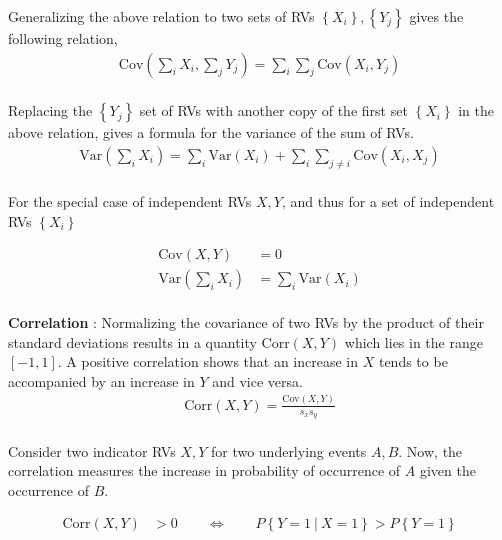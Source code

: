 Generalizing the above relation to two sets of RVs $ \left\{X_i\right\}, \left\{Y_j\right\} $ gives the following relation, 
\begin{align}
	\mathrm{Cov} \left( \sum\limits_{i}X_i , \sum\limits_{j}Y_j \right) = \sum\limits_{i} \sum\limits_{j} \mathrm{Cov} (X_i, Y_j)
\end{align} \\

Replacing the $ \left\{Y_j\right\} $ set of RVs with another copy of the first set $  \left\{X_i\right\} $ in the above relation, gives a formula for the variance of the sum of RVs. \\

\begin{align}
	\mathrm{Var} \left( \sum\limits_{i}X_i \right) = \sum\limits_{i} \mathrm{Var}(X_i) + \sum\limits_{i} \sum\limits_{j \neq i} \mathrm{Cov} (X_i, X_j)
\end{align} \\

For the special case of independent RVs $ X, Y $, and thus for a set of independent RVs $ \left\{X_i\right\} $

\begin{align}
	\mathrm{Cov}(X, Y) &= 0 \\
	\mathrm{Var} \left( \sum\limits_{i}X_i \right) &= \sum\limits_{i}\mathrm{Var}(X_i) 
\end{align} \\

\textbf{Correlation} : Normalizing the covariance of two RVs by the product of their standard deviations results in a quantity $ \mathrm{Corr}(X, Y) $ which lies in the range $ \left[-1, 1\right] $. A positive correlation shows that an increase in $ X $ tends to be accompanied by an increase in $ Y $ and vice versa. \\

\begin{align}
	\mathrm{Corr}(X, Y) = \frac{\mathrm{Cov}(X, Y)}{s_x s_y}
\end{align} \\

Consider two indicator RVs $ X, Y $ for two underlying events $ A, B $. Now, the correlation measures the increase in probability of occurrence of $ A $ given the occurrence of $ B $. 

\begin{align}
	\mathrm{Corr}(X, Y) &> 0  \qquad \Leftrightarrow \qquad P \left\{ Y = 1\ |\ X = 1 \right\} > P \left\{ Y = 1 \right\}
\end{align} \\

